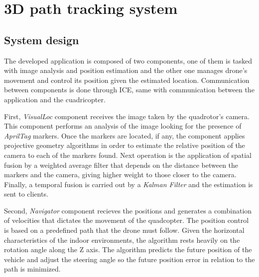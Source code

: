 \documentclass{styles/svproc}
\begin{document}
\section{3D path tracking system}

\subsection{System design}

The developed application is composed of two components, one of them is tasked with image analysis and position estimation and the other one manages drone's movement and control its position given the estimated location. Communication between components is done through ICE, same with communication between the application and the cuadricopter.
	
	First, \textit{VisualLoc} component receives the image taken by the quadrotor's camera. This component performs an analysis of the image looking for the presence of \textit{AprilTag} markers. Once the markers are located, if any, the component applies projective geometry algorithms in order to estimate the relative position of the camera to each of the markers found. Next operation is the application of spatial fusion by a weighted average filter that depends on the distance between the markers and the camera, giving higher weight to those closer to the camera. Finally, a temporal fusion is carried out by a \textit{Kalman Filter} and the estimation is sent to clients.

        Second, \textit{Navigator} component recieves the positions and generates a combination of velocities that dictates the movement of the quadcopter. The position control is based on a predefined path that the drone must follow. Given the horizontal characteristics of the indoor environments, the algorithm rests heavily on the rotation angle along the Z axis. The algorithm predicts the future position of the vehicle and adjust the steering angle so the future position error in relation to the path is minimized.
\end{document}
